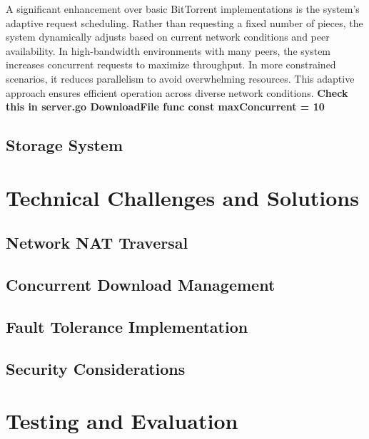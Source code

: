 \documentclass[12pt,a4paper]{report}
\begin{document}
A significant enhancement over basic BitTorrent implementations is the system's adaptive request scheduling. Rather than requesting a fixed number of pieces, the system dynamically adjusts based on current network conditions and peer availability. In high-bandwidth environments with many peers, the system increases concurrent requests to maximize throughput. In more constrained scenarios, it reduces parallelism to avoid overwhelming resources. This adaptive approach ensures efficient operation across diverse network conditions. \textbf{Check this in server.go DownloadFile func 	const maxConcurrent = 10}

\section{Storage System}

\chapter{Technical Challenges and Solutions}
\section{Network NAT Traversal}

\section{Concurrent Download Management}

\section{Fault Tolerance Implementation}

\section{Security Considerations}

\chapter{Testing and Evaluation}
\end{document}
